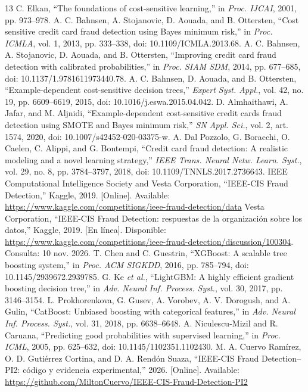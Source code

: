 \documentclass[conference,letterpaper]{IEEEtran}
\begin{document}
\begin{thebibliography}{13}
 C. Elkan, ``The foundations of cost-sensitive learning,'' in \emph{Proc. IJCAI}, 2001, pp. 973--978.
 A. C. Bahnsen, A. Stojanovic, D. Aouada, and B. Ottersten, ``Cost sensitive credit card fraud detection using Bayes minimum risk,'' in \emph{Proc. ICMLA}, vol. 1, 2013, pp. 333--338, doi: 10.1109/ICMLA.2013.68.
 A. C. Bahnsen, A. Stojanovic, D. Aouada, and B. Ottersten, ``Improving credit card fraud detection with calibrated probabilities,'' in \emph{Proc. SIAM SDM}, 2014, pp. 677--685, doi: 10.1137/1.9781611973440.78.
 A. C. Bahnsen, D. Aouada, and B. Ottersten, ``Example-dependent cost-sensitive decision trees,'' \emph{Expert Syst. Appl.}, vol. 42, no. 19, pp. 6609--6619, 2015, doi: 10.1016/j.eswa.2015.04.042.
 D. Almhaithawi, A. Jafar, and M. Aljnidi, ``Example-dependent cost-sensitive credit cards fraud detection using SMOTE and Bayes minimum risk,'' \emph{SN Appl. Sci.}, vol. 2, art. 1574, 2020, doi: 10.1007/s42452-020-03375-w.
 A. Dal Pozzolo, G. Boracchi, O. Caelen, C. Alippi, and G. Bontempi, ``Credit card fraud detection: A realistic modeling and a novel learning strategy,'' \emph{IEEE Trans. Neural Netw. Learn. Syst.}, vol. 29, no. 8, pp. 3784--3797, 2018, doi: 10.1109/TNNLS.2017.2736643.
 IEEE Computational Intelligence Society and Vesta Corporation, ``IEEE-CIS Fraud Detection,'' Kaggle, 2019. [Online]. Available: \url{https://www.kaggle.com/competitions/ieee-fraud-detection/data}
 Vesta Corporation, ``IEEE-CIS Fraud Detection: respuestas de la organización sobre los datos,'' Kaggle, 2019. [En línea]. Disponible: \url{https://www.kaggle.com/competitions/ieee-fraud-detection/discussion/100304}. Consulta: 10 nov. 2026.
 T. Chen and C. Guestrin, ``XGBoost: A scalable tree boosting system,'' in \emph{Proc. ACM SIGKDD}, 2016, pp. 785--794, doi: 10.1145/2939672.2939785.
 G. Ke \emph{et al.}, ``LightGBM: A highly efficient gradient boosting decision tree,'' in \emph{Adv. Neural Inf. Process. Syst.}, vol. 30, 2017, pp. 3146--3154.
 L. Prokhorenkova, G. Gusev, A. Vorobev, A. V. Dorogush, and A. Gulin, ``CatBoost: Unbiased boosting with categorical features,'' in \emph{Adv. Neural Inf. Process. Syst.}, vol. 31, 2018, pp. 6638--6648.
 A. Niculescu-Mizil and R. Caruana, ``Predicting good probabilities with supervised learning,'' in \emph{Proc. ICML}, 2005, pp. 625--632, doi: 10.1145/1102351.1102430.
 M. A. Cuervo Ramírez, O. D. Gutiérrez Cortina, and D. A. Rendón Suaza, ``IEEE-CIS Fraud Detection--PI2: código y evidencia experimental,'' 2026. [Online]. Available: \url{https://github.com/MiltonCuervo/IEEE-CIS-Fraud-Detection-PI2}
\end{thebibliography}
\end{document}
